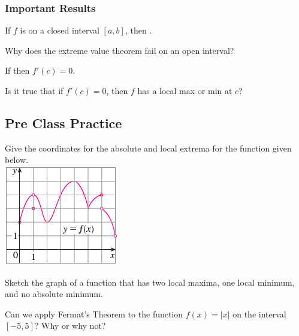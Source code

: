 \documentclass[notes]{subfiles}
\begin{document}
	\subsubsection*{Important Results}
		\begin{thm}
			If \(f\) is  on a closed interval \([a,b]\), then \vspace{20pt} .
		\end{thm}
		
		\begin{question}
			Why does the extreme value theorem fail on an open interval?  
		\end{question}
			
		\begin{thm}
			If \vspace{10pt} then \(f'(c) = 0\).
		\end{thm}
		
		\begin{question}
			Is it true that if $f'(c) = 0$, then $f$ has a local max or min at $c$?
		\end{question}
			\newpage
	
	\subsection*{Pre Class Practice}
		\begin{ex}
			Give the coordinates for the absolute and local extrema for the function given below.\\
			\includegraphics[scale = 1.25]{4.3fig2}
		\end{ex}
			
		\begin{ex}
			Sketch the graph of a function that has two local maxima, one local minimum, and no absolute minimum.
		\end{ex}
			
		\begin{ex}
			Can we apply Fermat's Theorem to the function $f(x) = |x|$ on the interval $[-5,5]$?  Why or why not? 
		\end{ex}
			
\end{document}
